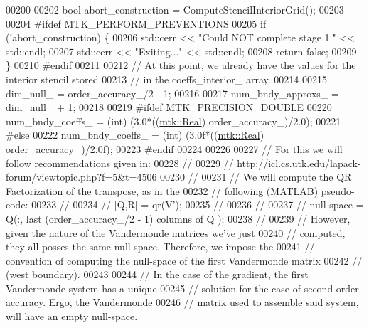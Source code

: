 \begin{DoxyCode}
00200 
00202   \textcolor{keywordtype}{bool} abort\_construction = ComputeStencilInteriorGrid();
00203 
00204 \textcolor{preprocessor}{  #ifdef MTK\_PERFORM\_PREVENTIONS}
00205   \textcolor{keywordflow}{if} (!abort\_construction) \{
00206     std::cerr << \textcolor{stringliteral}{"Could NOT complete stage 1."} << std::endl;
00207     std::cerr << \textcolor{stringliteral}{"Exiting..."} << std::endl;
00208     \textcolor{keywordflow}{return} \textcolor{keyword}{false};
00209   \}
00210 \textcolor{preprocessor}{  #endif}
00211 
00212   \textcolor{comment}{// At this point, we already have the values for the interior stencil stored}
00213   \textcolor{comment}{// in the coeffs\_interior\_ array.}
00214 
00215   dim\_null\_ = order\_accuracy\_/2 - 1;
00216 
00217   num\_bndy\_approxs\_ = dim\_null\_ + 1;
00218 
00219 \textcolor{preprocessor}{  #ifdef MTK\_PRECISION\_DOUBLE}
00220   num\_bndy\_coeffs\_ = (int) (3.0*((\hyperlink{group__c01-roots_gac080bbbf5cbb5502c9f00405f894857d}{mtk::Real}) order\_accuracy\_)/2.0);
00221 \textcolor{preprocessor}{  #else}
00222   num\_bndy\_coeffs\_ = (int) (3.0f*((\hyperlink{group__c01-roots_gac080bbbf5cbb5502c9f00405f894857d}{mtk::Real}) order\_accuracy\_)/2.0f);
00223 \textcolor{preprocessor}{  #endif}
00224 
00226 
00227   \textcolor{comment}{// For this we will follow recommendations given in:}
00228   \textcolor{comment}{//}
00229   \textcolor{comment}{// http://icl.cs.utk.edu/lapack-forum/viewtopic.php?f=5&t=4506}
00230   \textcolor{comment}{//}
00231   \textcolor{comment}{// We will compute the QR Factorization of the transpose, as in the}
00232   \textcolor{comment}{// following (MATLAB) pseudo-code:}
00233   \textcolor{comment}{//}
00234   \textcolor{comment}{// [Q,R] = qr(V'); %
00235   \textcolor{comment}{// %
00236   \textcolor{comment}{//}
00237   \textcolor{comment}{// null-space = Q(:, last (order\_accuracy\_/2 - 1) columns of Q );}
00238   \textcolor{comment}{//}
00239   \textcolor{comment}{// However, given the nature of the Vandermonde matrices we've just}
00240   \textcolor{comment}{// computed, they all posses the same null-space. Therefore, we impose the}
00241   \textcolor{comment}{// convention of computing the null-space of the first Vandermonde matrix}
00242   \textcolor{comment}{// (west boundary).}
00243 
00244   \textcolor{comment}{// In the case of the gradient, the first Vandermonde system has a unique}
00245   \textcolor{comment}{// solution for the case of second-order-accuracy. Ergo, the Vandermonde}
00246   \textcolor{comment}{// matrix used to assemble said system, will have an empty null-space.}
}}
\end{DoxyCode}
